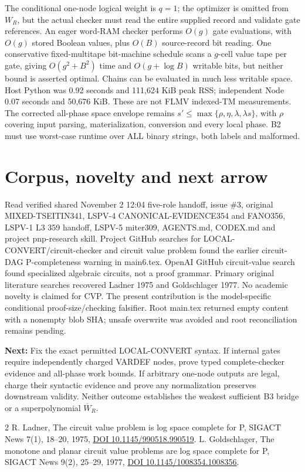 \documentclass[11pt]{article}
\begin{document}
The conditional one-node logical weight is $q=1$; the optimizer is omitted from $W_R$, but the actual checker must read the entire supplied record and validate gate references. An eager word-RAM checker performs $O(g)$ gate evaluations, with $O(g)$ stored Boolean values, plus $O(B)$ source-record bit reading. One conservative fixed-multitape bit-machine schedule scans a $g$-cell value tape per gate, giving $O(g^2+B^2)$ time and $O(g+\log B)$ writable bits, but neither bound is asserted optimal. Chains can be evaluated in much less writable space. Host Python was 0.92 seconds and 111,624 KiB peak RSS; independent Node 0.07 seconds and 50,676 KiB. These are not FLMV indexed-TM measurements. The corrected all-phase space envelope remains $s'\le\max\{\rho,\eta,\lambda,\lambda s\}$, with $\rho$ covering input parsing, materialization, conversion and every local phase. B2 must use worst-case runtime over ALL binary strings, both labels and malformed.

\section*{Corpus, novelty and next arrow}
Read verified shared November 2 12:04 five-role handoff, issue \#3, original MIXED-TSEITIN341, LSPV-4 CANONICAL-EVIDENCE354 and FANO356, LSPV-1 L3 359 handoff, LSPV-5 miter309, AGENTS.md, CODEX.md and project pnp-research skill. Project GitHub searches for LOCAL-CONVERT/circuit-checker and circuit value problem found the earlier circuit-DAG P-completeness warning in main6.tex. OpenAI GitHub circuit-value search found specialized algebraic circuits, not a proof grammar. Primary original literature searches recovered Ladner 1975 and Goldschlager 1977. No academic novelty is claimed for CVP. The present contribution is the model-specific conditional proof-size/checking falsifier. Root main.tex returned empty content with a nonempty blob SHA; unsafe overwrite was avoided and root reconciliation remains pending.

\noindent\textbf{Next:} Fix the exact permitted LOCAL-CONVERT syntax. If internal gates require independently charged VARDEF nodes, prove typed complete-checker evidence and all-phase work bounds. If arbitrary one-node outputs are legal, charge their syntactic evidence and prove any normalization preserves downstream validity. Neither outcome establishes the weakest sufficient B3 bridge or a superpolynomial $\overline W_R$.
\begin{thebibliography}{2}
 R. Ladner, The circuit value problem is log space complete for P, SIGACT News 7(1), 18--20, 1975, \href{https://doi.org/10.1145/990518.990519}{DOI 10.1145/990518.990519}.
 L. Goldschlager, The monotone and planar circuit value problems are log space complete for P, SIGACT News 9(2), 25--29, 1977, \href{https://doi.org/10.1145/1008354.1008356}{DOI 10.1145/1008354.1008356}.
\end{thebibliography}
\end{document}

